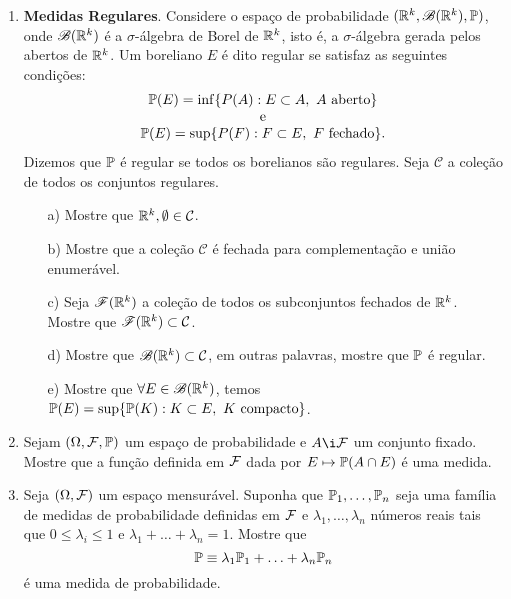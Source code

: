 \begin{enumerate}[leftmargin=*]
\item 
{\bf Medidas Regulares}. 
Considere o espaço de probabilidade
$(\R^k,\mathscr{B}(\R^k),\P)$, onde 
$\mathscr{B}(\R^k)$ é a $\sigma$-álgebra de Borel 
de $\R^k$, isto é, a $\sigma$-álgebra gerada pelos 
abertos de $\R^k$.
Um boreliano $E$ é dito regular se satisfaz as seguintes
condições:
\[
\begin{array}{c}
\P(E) = \inf\{P(A): E\subset A,\ A\ \text{aberto} \}
\\
\text{e}
\\
\P(E) = \sup\{P(F): F\subset E,\ F\ \text{fechado} \}.
\end{array}
\]
Dizemos que $\P$ é regular se todos os borelianos são 
regulares. Seja $\mathcal{C}$ a coleção de todos os
conjuntos regulares.
	\begin{itemize}
	\item[a)]
	Mostre que $\R^k,\emptyset\in \mathcal{C}$.
	
	\item[b)]
	Mostre que a coleção $\mathcal{C}$ é fechada 
	para complementação e união enumerável.
	
	\item[c)]
	Seja $\mathscr{F}(\R^k)$ a coleção de todos os 
	subconjuntos fechados de $\R^k$. Mostre que 
	$\mathscr{F}(\R^k)\subset \mathcal{C}$.
	
	\item[d)]
	Mostre que $\mathscr{B}(\R^k)\subset \mathcal{C}$, em outras palavras,
	mostre que $\P$ é regular.
	
	\item[e)] 
	Mostre que $\forall E\in\mathscr{B}(\R^k)$, temos
	$\P(E) = \sup\{ \P(K): K\subset E,\ K\ \text{compacto}\}$.
	\end{itemize}








\item Sejam $(\Omega,\F,\P)$ um espaço de probabilidade
e $A\i\F$ um conjunto fixado. Mostre que a função 
definida em $\F$ dada por $E\mapsto \P(A\cap E)$ é uma medida.


\item Seja $(\Omega,\F)$ um espaço mensurável. 
Suponha que $\P_1,\ldots, \P_n$ seja uma família 
de medidas de probabilidade definidas em $\F$ e 
$\lambda_1,\ldots,\lambda_n$ números reais tais que 
$0\leq \lambda_i\leq 1$ e $\lambda_1+\ldots+\lambda_n=1$.
Mostre que 
	\[
		\P\equiv \lambda_1\P_1+\ldots +\lambda_n\P_n
	\]
é uma medida de probabilidade.







\end{enumerate}
